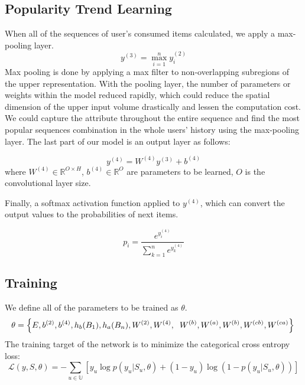 \documentclass[runningheads]{llncs}
\begin{document}
\subsection{Popularity Trend Learning}
When all of the sequences of user's consumed items calculated, we apply a max-pooling layer.
\begin{equation}
y^{(3)}=\max_{i=1}^{n}y_{i}^{(2)}
\end{equation}
Max pooling is done by applying a max filter to non-overlapping subregions of the upper representation. With the pooling layer, the number of parameters or weights within the model reduced rapidly, which could reduce the spatial dimension of the upper input volume drastically and lessen the computation cost. We could capture the attribute throughout the entire sequence and find the most popular sequences combination in the whole users' history using the max-pooling layer. The last part of our model is an output layer as follows:

\begin{equation}
y^{(4)}=W^{(4)}y^{(3)}+b^{(4)}
\end{equation}
where $W^{(4)}\in \mathbb{R}^{O\times H}$, $b^{(4)}\in \mathbb{R}^{O}$ are parameters to be learned, $O$ is the convolutional layer size.

Finally, a softmax activation function applied to $y^{(4)}$, which can convert the output values to the probabilities of next items. 

\begin{equation}
p_{i}= \frac{e^{y_{i}^{(4)}}}{\sum_{k=1}^{n}e^{y_{k}^{(4)}}}
\end{equation}

\subsection{Training}

We define all of the parameters to be trained as $\theta $.
\begin{equation}
\theta=  \left \{ E,b^{(2)},b^{(4)},h_{b}(B_{1}),h_{a}(B_{n}),W^{(2)}, W^{(4)},\right.\\
\left.W^{(b)},W^{(a)},W^{(b)},W^{(cb)},W^{(ca)} \right \} \\
\end{equation}
The training target of the network is to minimize the categorical cross entropy loss:
\begin{equation}
\mathcal{L}(y,S,\theta )=-\sum_{u\in \mathbb{U}}[y_{u}\log p(y_{u}|S_{u},\theta)+(1-y_{u})\log (1-p(y_{u}|S_{u},\theta ))]
\end{equation}
\end{document}
